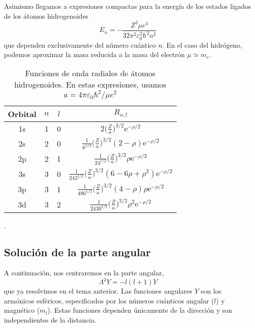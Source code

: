Asimismo llegamos a expresiones compactas para la energía de 
los estados ligados de los átomos hidrogenoides
\begin{equation}
    E_n=-\frac{Z^2\mu e^4}{32\pi^2\varepsilon_0^2\hbar^2 n^2}
    \label{eq:Eh}
\end{equation}
que dependen exclusivamente del número cuántico $n$. 
En el caso del hidrógeno, podemos aproximar la masa reducida
a la masa del electrón $\mu\simeq m_e$. 
\begin{table}[h!]
    \centering
    \begin{tabular}{|c|c|c|c|}
    \hline
         Orbital & $n$  & $l$ &$R_{n,l}$ \\
    \hline
    \hline
         1s & 1 & 0 & 
         $2\bigg(\frac{Z}{a}\bigg)^{3/2}\mathrm{e}^{-\rho/2}$ \\
         2s & 2 & 0 & 
         $\frac{1}{8^{1/2}}\bigg(\frac{Z}{a}\bigg)^{3/2}(2-\rho) \mathrm{e}^{-\rho/2}$\\
         2p & 2 & 1 & 
         $\frac{1}{24^{1/2}}\bigg(\frac{Z}{a}\bigg)^{3/2}\rho \mathrm{e}^{-\rho/2}$\\
         3s & 3 & 0 & 
         $\frac{1}{243^{1/2}}\bigg(\frac{Z}{a})^{3/2}(6-6\rho+\rho^2)\mathrm{e}^{-\rho/2}$ \\
         3p & 3 & 1 &
         $\frac{1}{486^{1/2}}\bigg(\frac{Z}{a}\bigg)^{3/2}(4-\rho)\rho \mathrm{e}^{-\rho/2}$ \\
         3d & 3 & 2 & $\frac{1}{2430^{1/2}}\bigg(\frac{Z}{a}\bigg)^{3/2}\rho^2\mathrm{e}^{-\rho/2}$ \\
    \hline
    \end{tabular}
    \caption{Funciones de onda radiales de átomos hidrogenoides. En estas expresiones, 
    usamos $a=4 \pi \varepsilon_0\hbar^2/\mu e^2$}. %
    \label{tb:radial_hydrogenoid}
\end{table}

\subsection{Solución de la parte angular}
A continuación, nos centraremos en la parte angular, 
\begin{equation}
    \Lambda^2Y=-l(l+1)Y
\end{equation}
que ya resolvimos en el tema anterior. Las funciones angulares $Y$ 
son los armónicos esféricos, especificados por los números cuánticos
angular ($l$) y magnético ($m_l$). Estas funciones dependen únicamente
de la dirección y son independientes de la distancia. 

